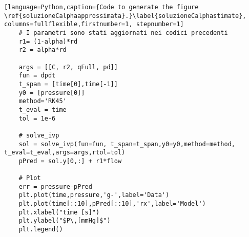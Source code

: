 \begin{lstlisting}[language=Python,caption={Code to generate the figure \ref{soluzioneCalphaapprossimata}.}\label{soluzioneCalphastimate}, columns=fullflexible,firstnumber=1, stepnumber=1]
    # I parametri sono stati aggiornati nei codici precedenti
    r1= (1-alpha)*rd
    r2 = alpha*rd
    
    args = [[C, r2, qFull, pd]]
    fun = dpdt
    t_span = [time[0],time[-1]]
    y0 = [pressure[0]]
    method='RK45'
    t_eval = time
    tol = 1e-6
    
    # solve_ivp
    sol = solve_ivp(fun=fun, t_span=t_span,y0=y0,method=method, t_eval=t_eval,args=args,rtol=tol)
    pPred = sol.y[0,:] + r1*flow
    
    # Plot
    err = pressure-pPred
    plt.plot(time,pressure,'g-',label='Data')
    plt.plot(time[::10],pPred[::10],'rx',label='Model')
    plt.xlabel("time [s]")
    plt.ylabel("$P\,[mmHg]$")
    plt.legend()
\end{lstlisting}
